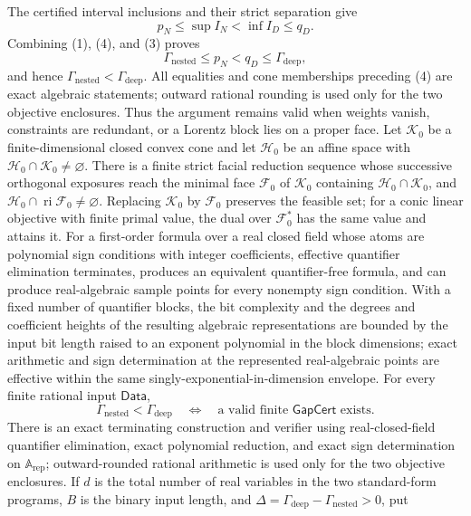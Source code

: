 The certified interval inclusions and their strict separation give
\[
 p_N\le \sup I_N<\inf I_D\le q_D. \tag{4}
\]
Combining (1), (4), and (3) proves
\[
 \Gamma_{\mathrm{nested}}
 \le p_N<q_D
 \le\Gamma_{\mathrm{deep}},
\]
and hence \(\Gamma_{\mathrm{nested}}<\Gamma_{\mathrm{deep}}\).  All equalities
and cone memberships preceding (4) are exact algebraic statements; outward
rational rounding is used only for the two objective enclosures.  Thus the
argument remains valid when weights vanish, constraints are redundant, or a
Lorentz block lies on a proper face.
Let \(\mathcal K_0\) be a finite-dimensional closed convex cone and let
\(\mathcal H_0\) be an affine space with
\(\mathcal H_0\cap\mathcal K_0\ne\varnothing\).  There is a finite strict facial
reduction sequence whose successive orthogonal exposures reach the minimal
face \(\mathcal F_0\) of \(\mathcal K_0\) containing
\(\mathcal H_0\cap\mathcal K_0\), and
\(\mathcal H_0\cap\operatorname{ri}\mathcal F_0\ne\varnothing\).  Replacing
\(\mathcal K_0\) by \(\mathcal F_0\) preserves
the feasible set; for a conic linear objective with finite primal value, the
dual over \(\mathcal F_0^*\) has the same value and attains it.
For a first-order formula over a real closed field whose atoms are polynomial
sign conditions with integer coefficients, effective quantifier elimination
terminates, produces an equivalent quantifier-free formula, and can produce
real-algebraic sample points for every nonempty sign condition.  With a fixed
number of quantifier blocks, the bit complexity and the degrees and coefficient
heights of the resulting algebraic representations are bounded by the input
bit length raised to an exponent polynomial in the block dimensions; exact
arithmetic and sign determination at the represented real-algebraic points are
effective within the same singly-exponential-in-dimension envelope.
For every finite rational input \(\mathsf{Data}\),
\[
 \Gamma_{\mathrm{nested}}<\Gamma_{\mathrm{deep}}
 \quad\Longleftrightarrow\quad
 \text{a valid finite }\mathsf{GapCert}\text{ exists}.
\]
There is an exact terminating construction and verifier using real-closed-field
quantifier elimination, exact polynomial reduction, and exact sign
determination on \(\mathbb A_{\mathrm{rep}}\); outward-rounded rational
arithmetic is used only for the two objective enclosures.  If \(d\) is the
total number of real variables in the two standard-form programs,
\(B\) is the binary input length, and
\(\Delta=\Gamma_{\mathrm{deep}}-\Gamma_{\mathrm{nested}}>0\), put
